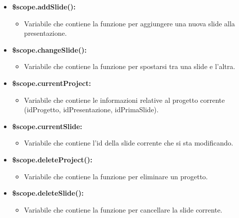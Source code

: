 \begin{itemize}
%	
%	


	\item \textbf{\$scope.addSlide():}
	\begin{itemize}
		\item Variabile che contiene la funzione per aggiungere una nuova slide alla presentazione.
	\end{itemize}
	
	\item \textbf{\$scope.changeSlide():}
	\begin{itemize}
		\item Variabile che contiene la funzione per spostarsi tra una slide e l'altra.
	\end{itemize}
	
	\item \textbf{\$scope.currentProject:}
	\begin{itemize}
		\item Variabile che contiene le informazioni relative al progetto corrente (idProgetto, idPresentazione, idPrimaSlide).
	\end{itemize}
	
	\item \textbf{\$scope.currentSlide:}
	\begin{itemize}
		\item Variabile che contiene l'id della slide corrente che si sta modificando.
	\end{itemize}
	
	\item \textbf{\$scope.deleteProject():}
	\begin{itemize}
		\item Variabile che contiene la funzione per eliminare un progetto.
	\end{itemize}
	
	\item \textbf{\$scope.deleteSlide():}
	\begin{itemize}
		\item Variabile che contiene la funzione per cancellare la slide corrente.
	\end{itemize}
	

\end{itemize}
